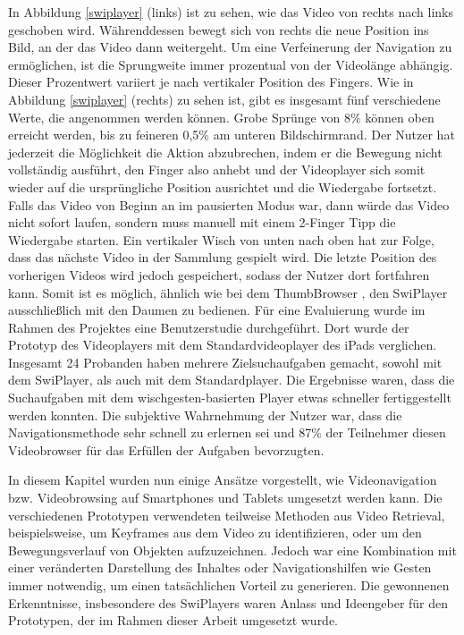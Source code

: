 \documentclass[11pt,a4paper]{report}
\begin{document}
In Abbildung \ref{swiplayer} (links) ist zu sehen, wie das Video von rechts nach links geschoben wird. Währenddessen bewegt sich von rechts die neue Position ins Bild, an der das Video dann weitergeht. Um eine Verfeinerung der Navigation zu ermöglichen, ist die Sprungweite immer prozentual von der Videolänge abhängig. Dieser Prozentwert variiert je nach vertikaler Position des Fingers. Wie in Abbildung \ref{swiplayer} (rechts) zu sehen ist, gibt es insgesamt fünf verschiedene Werte, die angenommen werden können. Grobe Sprünge von 8\% können oben erreicht werden, bis zu feineren 0,5\% am unteren Bildschirmrand. Der Nutzer hat jederzeit die Möglichkeit die Aktion abzubrechen, indem er die Bewegung nicht vollständig ausführt, den Finger also anhebt und der Videoplayer sich somit wieder auf die ursprüngliche Position ausrichtet und die Wiedergabe fortsetzt. Falls das Video von Beginn an im pausierten Modus war, dann würde das Video nicht sofort laufen, sondern muss manuell mit einem 2-Finger Tipp die Wiedergabe starten. Ein vertikaler Wisch von unten nach oben hat zur Folge, dass das nächste Video in der Sammlung gespielt wird. Die letzte Position des vorherigen Videos wird jedoch gespeichert, sodass der Nutzer dort fortfahren kann. Somit ist es möglich, ähnlich wie bei dem ThumbBrowser \cite{hudelist2013mobile}, den SwiPlayer ausschließlich mit den Daumen zu bedienen. Für eine Evaluierung wurde im Rahmen des Projektes eine Benutzerstudie durchgeführt. Dort wurde der Prototyp des Videoplayers mit dem Standardvideoplayer des iPads verglichen. Insgesamt 24 Probanden haben mehrere Zielsuchaufgaben gemacht, sowohl mit dem SwiPlayer, als auch mit dem Standardplayer. Die Ergebnisse waren, dass die Suchaufgaben mit dem wischgesten-basierten Player etwas schneller fertiggestellt werden konnten. Die subjektive Wahrnehmung der Nutzer war, dass die Navigationsmethode sehr schnell zu erlernen sei und 87\% der Teilnehmer diesen Videobrowser für das Erfüllen der Aufgaben bevorzugten.

In diesem Kapitel wurden nun einige Ansätze vorgestellt, wie Videonavigation bzw. Videobrowsing auf Smartphones und Tablets umgesetzt werden kann. Die verschiedenen Prototypen verwendeten teilweise Methoden aus Video Retrieval, beispielsweise, um Keyframes aus dem Video zu identifizieren, oder um den Bewegungsverlauf von Objekten aufzuzeichnen. Jedoch war eine Kombination mit einer veränderten Darstellung des Inhaltes oder Navigationshilfen wie Gesten immer notwendig, um einen tatsächlichen Vorteil zu generieren. Die gewonnenen Erkenntnisse, insbesondere des SwiPlayers waren Anlass und Ideengeber für den Prototypen, der im Rahmen dieser Arbeit umgesetzt wurde.
\end{document}
